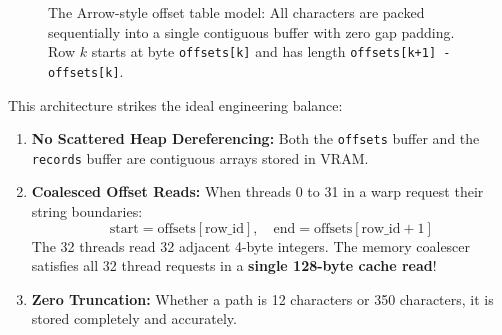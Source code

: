 \documentclass[a4paper,11pt]{article}
\begin{document}
\begin{figure}[htbp]
\centering
{}
\caption{The Arrow-style offset table model: All characters are packed sequentially into a single contiguous buffer with zero gap padding. Row $k$ starts at byte \texttt{offsets[k]} and has length \texttt{offsets[k+1] - offsets[k]}.}
\label{fig:arrow_layout}
\end{figure}

This architecture strikes the ideal engineering balance:
\begin{enumerate}
  \item \textbf{No Scattered Heap Dereferencing:} Both the \texttt{offsets} buffer and the \texttt{records} buffer are contiguous arrays stored in VRAM.
  \item \textbf{Coalesced Offset Reads:} When threads 0 to 31 in a warp request their string boundaries:
  \begin{equation}
    \text{start} = \text{offsets}[\text{row\_id}], \quad \text{end} = \text{offsets}[\text{row\_id} + 1]
  \end{equation}
  The 32 threads read 32 adjacent 4-byte integers. The memory coalescer satisfies all 32 thread requests in a \textbf{single 128-byte cache read}!
  \item \textbf{Zero Truncation:} Whether a path is 12 characters or 350 characters, it is stored completely and accurately.
\end{enumerate}
\end{document}
